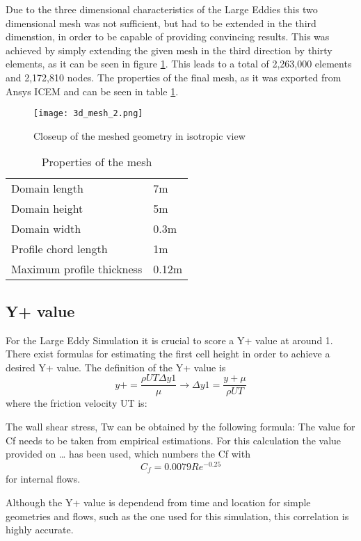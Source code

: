 Due to the three dimensional characteristics of the Large Eddies this two dimensional mesh was not sufficient, but had to be extended in the third dimenstion, in order to be capable of providing convincing results. This was achieved by simply extending the given mesh in the third direction by thirty elements, as it can be seen in figure \ref{fig:mesh_iso}. This leads to a total of 2,263,000 elements and 2,172,810 nodes. The properties of the final mesh, as it was exported from Ansys ICEM and can be seen in table \ref{tab:mesh_prop}.
\begin{figure}[h]
\centering
\texttt{[image: 3d\_mesh\_2.png]}
\caption{Closeup of the meshed geometry in isotropic view}
\label{fig:mesh_iso}
\end{figure}
\begin{table}[h]
\centering
\caption{Properties of the mesh}
\label{tab:mesh_prop}
\begin{tabular}{ll}
Domain length&7m\\
Domain height&5m\\
Domain width&0.3m\\
Profile chord length&1m\\
Maximum profile thickness&0.12m\\
\end{tabular}
\end{table}


\subsection{Y+ value}
For the Large Eddy Simulation it is crucial to score a Y+ value at around 1. There exist formulas for estimating the first cell height in order to achieve a desired Y+ value.
The definition of the Y+ value is
\begin{equation}
y+ =  \frac{\rho UT \Delta y1}{\mu}  \rightarrow \Delta y1 = \frac{y+ \mu}{\rho UT}
\end{equation}  
where the friction velocity UT is:

The wall shear stress, Tw can be obtained by the following formula:
The value for Cf needs to be taken from empirical estimations. For this calculation the value provided on … has been used, which numbers the Cf with
\begin{equation}
C_f = 0.0079 Re^{-0.25}
\end{equation}
for internal flows.

Although the Y+ value is dependend from time and location for simple geometries and flows, such as the one used for this simulation, this correlation is highly accurate.

